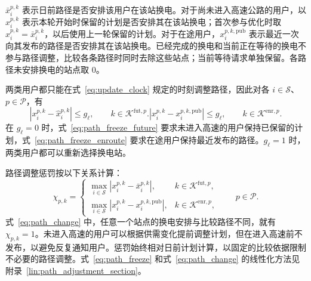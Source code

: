 $\bar x_i^{p,k}$ 表示日前路径是否安排该用户在该站换电。对于尚未进入高速公路的用户，以 $\widehat x_i^{p,k}$ 表示本轮开始时保留的计划是否安排其在该站换电；首次参与优化时取 $\widehat x_i^{p,k}=\bar x_i^{p,k}$，以后使用上一轮保留的计划。对于在途用户，$x_i^{p,k,\mathrm{pub}}$ 表示最近一次向其发布的路径是否安排其在该站换电。已经完成的换电和当前正在等待的换电不参与路径调整，比较各条路径时同时去除这些站点；当前等待请求单独保留。各路径未安排换电的站点取 $0$。

两类用户都只能在式~\eqref{eq:update_clock} 规定的时刻调整路径，因此对各 $i\in\mathcal S$、$p\in\mathcal P$，有
\begin{subequations}\label{eq:path_freeze}
\begin{equation}
|x_i^{p,k}-\widehat x_i^{p,k}|\le g_\ell,
\qquad k\in\mathcal K^{\mathrm{fut},p}.
\label{eq:path_freeze_future}
\end{equation}
\begin{equation}
|x_i^{p,k}-x_i^{p,k,\mathrm{pub}}|\le g_\ell,
\qquad k\in\mathcal K^{\mathrm{enr},p}.
\label{eq:path_freeze_enroute}
\end{equation}
\end{subequations}
在 $g_\ell=0$ 时，式~\eqref{eq:path_freeze_future} 要求未进入高速的用户保持已保留的计划，式~\eqref{eq:path_freeze_enroute} 要求在途用户保持最近发布的路径。$g_\ell=1$ 时，两类用户都可以重新选择换电站。

路径调整惩罚按以下关系计算：
\begin{equation}
\chi_{p,k}=\begin{cases}
\displaystyle\max_{i\in\mathcal S}|x_i^{p,k}-\bar x_i^{p,k}|,
&k\in\mathcal K^{\mathrm{fut},p},\\
\displaystyle\max_{i\in\mathcal S}|x_i^{p,k}-x_i^{p,k,\mathrm{pub}}|,
&k\in\mathcal K^{\mathrm{enr},p},
\end{cases}
\qquad p\in\mathcal P.
\label{eq:path_change}
\end{equation}
式~\eqref{eq:path_change} 中，任意一个站点的换电安排与比较路径不同，就有 $\chi_{p,k}=1$。未进入高速的用户可以根据供需变化提前调整计划，但在进入高速前不发布，以避免反复通知用户。惩罚始终相对日前计划计算，以固定的比较依据限制不必要的路径调整。式~\eqref{eq:path_freeze} 和式~\eqref{eq:path_change} 的线性化方法见附录~\ref{lin:path_adjustment_section}。

